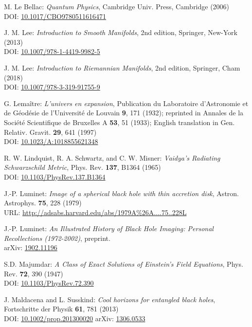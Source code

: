\begin{thebibliography}{123}
M. Le Bellac:
{\em Quantum Physics},
Cambridge Univ. Press, Cambridge (2006)\\
DOI: \href{https://doi.org/10.1017/CBO9780511616471}{10.1017/CBO9780511616471}

J. M. Lee: {\em Introduction to Smooth Manifolds}, 2nd edition,
Springer, New-York (2013)\\
DOI: \href{https://doi.org/10.1007/978-1-4419-9982-5}{10.1007/978-1-4419-9982-5}

J. M. Lee: {\em Introduction to Riemannian Manifolds}, 2nd edition,
Springer, Cham (2018)\\
DOI: \href{https://doi.org/10.1007/978-3-319-91755-9}{10.1007/978-3-319-91755-9}

G. Lemaître: {\em L'univers en expansion},
Publication du Laboratoire d'Astronomie et de Géodésie de l'Université
de Louvain {\bf 9},  171 (1932); reprinted in
Annales de la Société Scientifique de Bruxelles A {\bf 53}, 51 (1933);
English translation in
Gen. Relativ. Gravit. {\bf 29}, 641 (1997)\\
DOI: \href{https://doi.org/10.1023/A:1018855621348}{10.1023/A:1018855621348}

R. W. Lindquist, R. A. Schwartz, and C. W. Misner:
{\em Vaidya's Radiating Schwarzschild Metric},
Phys. Rev. {\bf 137}, B1364 (1965)\\
DOI: \href{https://doi.org/10.1103/PhysRev.137.B1364}{10.1103/PhysRev.137.B1364}

J.-P. Luminet: {\em Image of a spherical black hole with thin accretion disk},
Astron. Astrophys. {\bf 75}, 228 (1979)\\
URL: \url{http://adsabs.harvard.edu/abs/1979A%26A....75..228L}

J.-P. Luminet:
{\em An Illustrated History of Black Hole Imaging: Personal Recollections (1972-2002)}, preprint.\\
arXiv: \href{https://arxiv.org/abs/1902.11196}{1902.11196}

S.D. Majumdar:
{\em A Class of Exact Solutions of Einstein's Field Equations},
Phys. Rev. {\bf 72}, 390 (1947)\\
DOI: \href{https://doi.org/10.1103/PhysRev.72.390}{10.1103/PhysRev.72.390}

J. Maldacena and L. Susskind:
{\em Cool horizons for entangled black holes},
Fortschritte der Physik {\bf 61}, 781 (2013)\\
DOI: \href{https://doi.org/10.1002/prop.201300020}{10.1002/prop.201300020}\hfill
arXiv: \href{https://arxiv.org/abs/1306.0533}{1306.0533}


\end{thebibliography}
